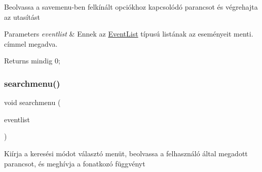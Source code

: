 Beolvassa a savemenu-\/ben felkínált opciókhoz kapcsolódó parancsot és végrehajta az utasítást 
\begin{DoxyParams}{Parameters}
{\em eventlist} & Ennek az \hyperlink{struct_event_list}{Event\+List} típusú listának az eseményeit menti. címmel megadva. \\
\hline
\end{DoxyParams}
\begin{DoxyReturn}{Returns}
mindig 0; 
\end{DoxyReturn}
\mbox{\label{group__menu_ga38d64ff02f60ebcb1988655ea12540a6}} 
\subsubsection{\texorpdfstring{searchmenu()}{searchmenu()}}
{\footnotesize\ttfamily void searchmenu (\begin{DoxyParamCaption}\item[{\hyperlink{struct_event_list}{Event\+List} $\ast$}]{eventlist }\end{DoxyParamCaption})}

Kiírja a keresési módot választó menüt, beolvassa a felhasználó által megadott parancsot, és meghívja a fonatkozó függvényt 